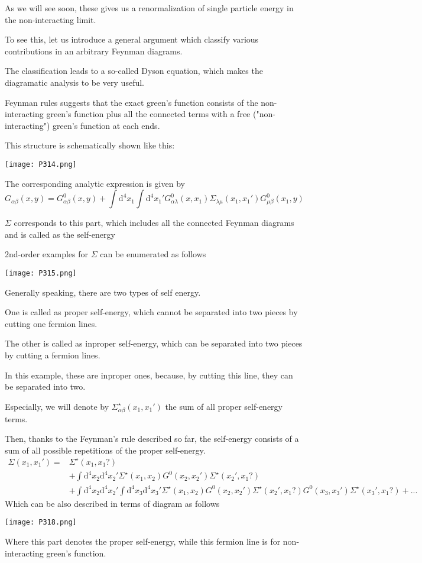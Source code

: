 As we will see soon, these gives us a renormalization of single particle energy in the non-interacting limit.

To see this, let us introduce a general argument which classify various contributions in an arbitrary Feynman diagrams.

The classification leads to a so-called Dyson equation, which makes the diagramatic analysis to be very useful.

Feynman rules suggests that the exact green's function consists of the non-interacting green's function plus all the connected terms with a free ("non-interacting") green's function at each ends.

This structure is schematically shown like this:
\begin{center}
\texttt{[image: P314.png]}
\end{center}
The corresponding analytic expression is given by
$$G_{\alpha\beta}(x,y)=G_{\alpha\beta}^0(x,y)+\int \mathrm{d}^4x_1\int \mathrm{d}^4x_1'G_{\alpha\lambda}^0(x,x_1)\Sigma_{\lambda\mu}(x_1,x_1')G_{\mu\beta}^0(x_1,y)$$

$\Sigma$ corresponds to this part, which includes all the connected Feynman diagrams and is called as the self-energy

2nd-order examples for $\Sigma$ can be enumerated as follows
\begin{center}
\texttt{[image: P315.png]}
\end{center}
Generally speaking, there are two types of self energy.

One is called as proper self-energy, which cannot be separated into two  pieces by cutting one fermion lines.

The other is called as inproper  self-energy, which can be separated into two pieces by cutting a fermion lines.

In this example, these are inproper ones, because, by cutting this line, they can be separated into two.

Especially, we will denote by $\Sigma^{\star}_{\alpha\beta}(x_1,x_1')$ the sum of all proper self-energy terms.

Then, thanks to the Feynman's rule described so far, the self-energy consists of a sum of all possible repetitions of the proper self-energy.
\begin{align}
\Sigma(x_1,x_1')=&\Sigma^{\star}(x_1,x_1?) \nonumber \\
&+\int \mathrm{d}^4x_2\mathrm{d}^4x_2'\Sigma^{\star}(x_1,x_2)G^0(x_2,x_2')\Sigma^{\star}(x_2',x_1?) \nonumber \\
&+\int \mathrm{d}^4x_2\mathrm{d}^4x_2'\int \mathrm{d}^4x_3\mathrm{d}^4x_3'\Sigma^{\star}(x_1,x_2)G^0(x_2,x_2')\Sigma^{\star}(x_2',x_1?)G^0(x_3,x_3')\Sigma^{\star}(x_3',x_1?)+... \nonumber
\end{align}
Which can be also described in terms of diagram as follows 
\begin{center}
\texttt{[image: P318.png]}
\end{center}
Where this part denotes the proper self-energy, while this fermion line is for non-interacting green's function.

